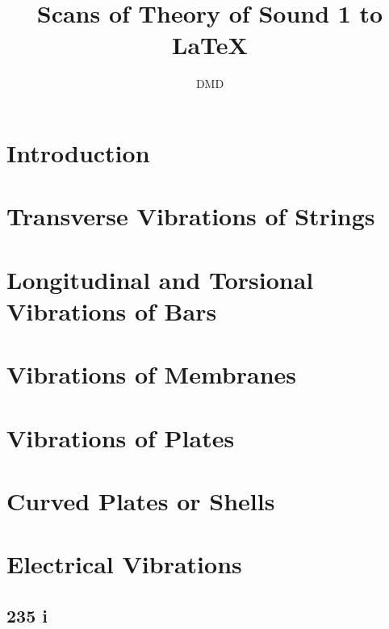 \documentclass[11pt,a4paper,draft]{book}
\title{Scans of Theory of Sound 1 to LaTeX}
\begin{document}
 \author{DMD} \maketitle
\date{}

\frontmatter
\tableofcontents
%
%
\mainmatter

\chapter{Introduction}\label{introduction}


\chapter{Transverse Vibrations of Strings}
\label{transverse-vibrations-of-strings}


\chapter{Longitudinal and Torsional Vibrations of Bars}
\label{longitudinal-and-torsional-vibrations-of-bars}


\chapter{Vibrations of Membranes}\label{vibrations-of-membranes}


\chapter{Vibrations of Plates}\label{vibrations-of-plates}


\chapter{Curved Plates or Shells}

\chapter{Electrical Vibrations} \section{235 i}

\end{document}
